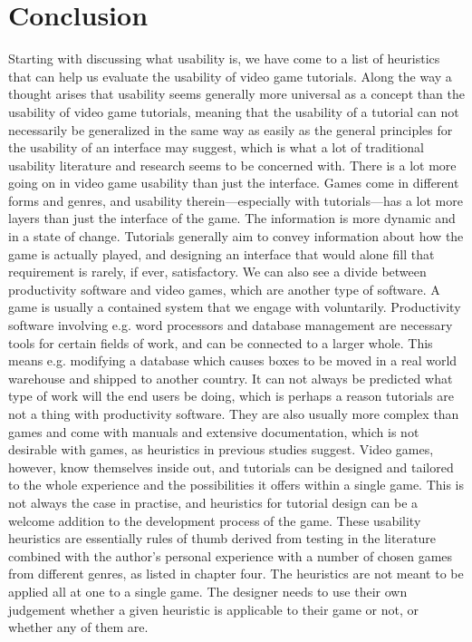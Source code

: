 \chapter{Conclusion}
Starting with discussing what usability is, we have come to a list of heuristics that can help us evaluate the usability of video game tutorials. Along the way a thought arises that usability seems generally more universal as a concept than the usability of video game tutorials, meaning that the usability of a tutorial can not necessarily be generalized in the same way as easily as the general principles for the usability of an interface may suggest, which is what a lot of traditional usability literature and research seems to be concerned with. There is a lot more going on in video game usability than just the interface. Games come in different forms and genres, and usability therein---especially with tutorials---has a lot more layers than just the interface of the game. The information is more dynamic and in a state of change. Tutorials generally aim to convey information about how the game is actually played, and designing an interface that would alone fill that requirement is rarely, if ever, satisfactory. We can also see a divide between productivity software and video games, which are another type of software. A game is usually a contained system that we engage with voluntarily. Productivity software involving e.g. word processors and database management are necessary tools for certain fields of work, and can be connected to a larger whole. This means e.g. modifying a database which causes boxes to be moved in a real world warehouse and shipped to another country. It can not always be predicted what type of work will the end users be doing, which is perhaps a reason tutorials are not a thing with productivity software. They are also usually more complex than games and come with manuals and extensive documentation, which is not desirable with games, as heuristics in previous studies suggest. Video games, however, know themselves inside out, and tutorials can be designed and tailored to the whole experience and the possibilities it offers within a single game. This is not always the case in practise, and heuristics for tutorial design can be a welcome addition to the development process of the game. These usability heuristics are essentially rules of thumb derived from testing in the literature combined with the author's personal experience with a number of chosen games from different genres, as listed in chapter four. The heuristics are not meant to be applied all at one to a single game. The designer needs to use their own judgement whether a given heuristic is applicable to their game or not, or whether any of them are. 

